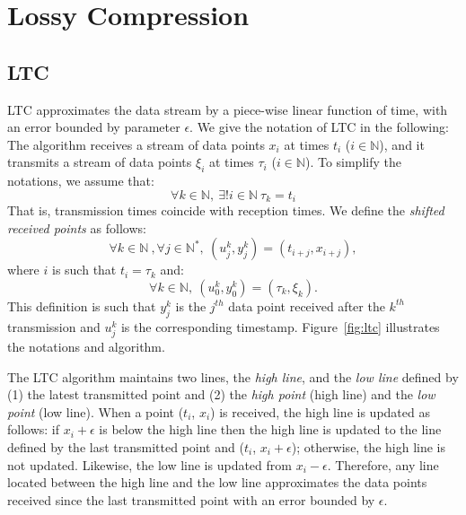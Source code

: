\section{Lossy Compression}

\subsection{LTC}
LTC approximates the data stream by a piece-wise linear function of time, with
an error bounded by parameter $\epsilon$. We give the notation of LTC in the
following: The algorithm receives a stream of data points $x_i$ at times $t_i$
($i \in \mathbb{N}$), and it transmits a stream of data points $\xi_i$ at times
$\tau_i$ ($i \in \mathbb{N}$). To simplify the notations, we assume that:
\begin{equation*}
\forall k \in \mathbb{N}, \  \exists ! i \in \mathbb{N} \  \tau_k = t_i
\end{equation*}
That is, transmission times coincide with reception times.
We define the \emph{shifted received points} as follows:
\begin{equation*}
\forall k \in \mathbb{N}\ , \forall j \in \mathbb{N^*},\ (u^k_j, y^k_j) = (t_{i+j}, x_{i+j}), 
\end{equation*}
where $i$ is such that $t_i = \tau_k$ and:
\begin{equation*}
\forall k \in \mathbb{N},\  (u^k_0, y^k_0) = (\tau_k, \xi_k).
\end{equation*}
This definition is such that $y^k_j$ is the $j^{th}$ data point received
after the $k^{th}$ transmission and $u^k_j$ is the corresponding timestamp.
Figure~\ref{fig:ltc} illustrates the notations and algorithm.

The LTC algorithm maintains two lines, the \emph{high line}, and the
\emph{low line} defined by (1) the latest transmitted point and (2) the
\emph{high point} (high line) and the \emph{low point} (low line). When
a point ($t_i$, $x_i$) is received, the high line is updated as
follows: if $x_i+\epsilon$ is below the high line then the high line is
updated to the line defined by the last transmitted point and ($t_i$,
$x_i+\epsilon$); otherwise, the high line is not updated. Likewise, the low line
is updated from $x_i-\epsilon$. Therefore, any line located between the
high line and the low line approximates the data points received since
the last transmitted point with an error bounded by $\epsilon$.

